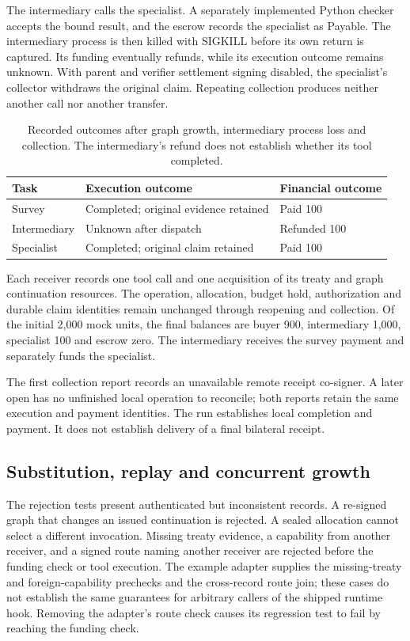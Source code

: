 The intermediary calls the specialist. A separately implemented Python checker
accepts the bound result, and the escrow records the specialist as
\textsf{Payable}. The intermediary process is then killed with SIGKILL before
its own return is captured. Its funding eventually refunds, while its execution
outcome remains unknown. With parent and verifier settlement signing disabled,
the specialist's collector withdraws the original claim. Repeating collection
produces neither another call nor another transfer.

\begin{table}[ht]
\centering\small
\begin{tabularx}{\linewidth}{@{}l X l@{}}
\toprule
Task & Execution outcome & Financial outcome\\
\midrule
Survey & Completed; original evidence retained & Paid 100\\
Intermediary & Unknown after dispatch & Refunded 100\\
Specialist & Completed; original claim retained & Paid 100\\
\bottomrule
\end{tabularx}
\caption{Recorded outcomes after graph growth, intermediary process loss and
collection. The intermediary's refund does not establish whether its tool
completed.}
\label{tab:trajectory}
\end{table}

Each receiver records one tool call and one acquisition of its treaty and graph
continuation resources. The operation, allocation, budget hold, authorization
and durable claim identities remain unchanged through reopening and collection.
Of the initial 2,000 mock units, the final balances are buyer 900, intermediary
1,000, specialist 100 and escrow zero. The intermediary receives the survey
payment and separately funds the specialist.

The first collection report records an unavailable remote receipt co-signer.
A later open has no unfinished local operation to reconcile; both reports retain
the same execution and payment identities. The run establishes local completion
and payment. It does not establish delivery of a final bilateral receipt.

\subsection{Substitution, replay and concurrent growth}
The rejection tests present authenticated but inconsistent records. A re-signed
graph that changes an issued continuation is rejected. A sealed allocation
cannot select a different invocation. Missing treaty evidence, a capability
from another receiver, and a signed route naming another receiver are rejected
before the funding check or tool execution. The example adapter supplies the
missing-treaty and foreign-capability prechecks and the cross-record route join;
these cases do not establish the same guarantees for arbitrary callers of the
shipped runtime hook. Removing the adapter's route check causes its regression
test to fail by reaching the funding check.

